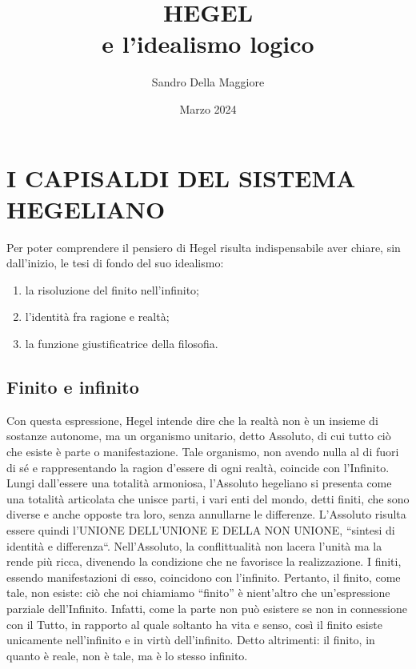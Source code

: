 \documentclass[a4paper,12pt,oneside,openany]{book}%
\begin{document}
	\author{Sandro Della Maggiore}
	\title{\Huge HEGEL\\{\Large e l'idealismo logico}}
	\date{Marzo 2024}
	\maketitle

\section*{I CAPISALDI DEL SISTEMA HEGELIANO}
	
Per poter comprendere il pensiero di Hegel risulta indispensabile aver chiare, sin dall’inizio, le tesi di fondo del suo idealismo:

\begin{enumerate}
	\item  la risoluzione del finito nell’infinito;
	\item l’identità fra ragione e realtà;
	\item la funzione giustificatrice della filosofia.
\end{enumerate}

\subsection*{Finito e infinito}

Con questa espressione, Hegel intende dire che la realtà non è un insieme di sostanze autonome, ma un organismo unitario, detto Assoluto, di cui tutto ciò che esiste è parte o manifestazione. Tale organismo, non avendo nulla al di fuori di sé e rappresentando la ragion d’essere di ogni realtà, coincide con l’Infinito. Lungi dall’essere una totalità armoniosa, l’Assoluto hegeliano si presenta come una totalità articolata che unisce parti, i vari enti del mondo, detti finiti, che sono diverse e anche opposte tra loro, senza annullarne le differenze. L’Assoluto risulta essere quindi l’UNIONE DELL’UNIONE E DELLA NON UNIONE, “sintesi di identità e differenza“. Nell’Assoluto, la conflittualità non lacera l’unità ma la rende più ricca, divenendo la condizione che ne favorisce la realizzazione. I finiti, essendo manifestazioni di esso, coincidono con l’infinito. Pertanto, il finito, come tale, non esiste: ciò che noi chiamiamo “finito” è nient’altro che un’espressione parziale dell’Infinito. Infatti, come la parte non può esistere se non in connessione con il Tutto, in rapporto al quale soltanto ha vita e senso, così il finito esiste unicamente nell’infinito e in virtù dell’infinito. Detto altrimenti: il finito, in quanto è reale, non è tale, ma è lo stesso infinito.
\end{document}
